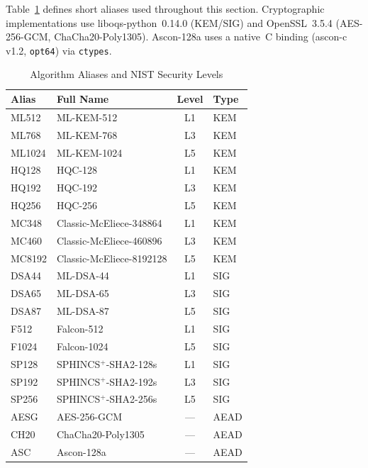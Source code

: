 Table~\ref{tab:aliases} defines short aliases used throughout this section.
Cryptographic implementations use liboqs-python~0.14.0 (KEM/SIG) and
OpenSSL~3.5.4 (AES-256-GCM, ChaCha20-Poly1305). Ascon-128a uses a native~C
binding (ascon-c v1.2, \texttt{opt64}) via \texttt{ctypes}.

\begin{table}[t]
\centering
\caption{Algorithm Aliases and NIST Security Levels}
\label{tab:aliases}
\footnotesize
\begin{tabular}{@{}llcl@{}}
\toprule
\textbf{Alias} & \textbf{Full Name} & \textbf{Level} & \textbf{Type} \\
\midrule
ML512  & ML-KEM-512                & L1 & KEM  \\
ML768  & ML-KEM-768                & L3 & KEM  \\
ML1024 & ML-KEM-1024               & L5 & KEM  \\
HQ128  & HQC-128                   & L1 & KEM  \\
HQ192  & HQC-192                   & L3 & KEM  \\
HQ256  & HQC-256                   & L5 & KEM  \\
MC348  & Classic-McEliece-348864   & L1 & KEM  \\
MC460  & Classic-McEliece-460896   & L3 & KEM  \\
MC8192 & Classic-McEliece-8192128  & L5 & KEM  \\
\midrule
DSA44  & ML-DSA-44                 & L1 & SIG  \\
DSA65  & ML-DSA-65                 & L3 & SIG  \\
DSA87  & ML-DSA-87                 & L5 & SIG  \\
F512   & Falcon-512                & L1 & SIG  \\
F1024  & Falcon-1024               & L5 & SIG  \\
SP128  & SPHINCS$^+$-SHA2-128s     & L1 & SIG  \\
SP192  & SPHINCS$^+$-SHA2-192s     & L3 & SIG  \\
SP256  & SPHINCS$^+$-SHA2-256s     & L5 & SIG  \\
\midrule
AESG   & AES-256-GCM               & ---& AEAD \\
CH20   & ChaCha20-Poly1305         & ---& AEAD \\
ASC    & Ascon-128a                & ---& AEAD \\
\bottomrule
\end{tabular}
\end{table}

